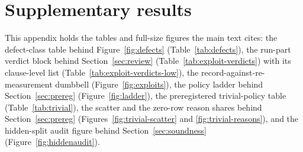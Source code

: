 \section{Supplementary results}
\label{app:results}

This appendix holds the tables and full-size figures the main text cites: the defect-class table behind Figure~\ref{fig:defects} (Table~\ref{tab:defects}), the run-part verdict block behind Section~\ref{sec:review} (Table~\ref{tab:exploit-verdicts}) with its clause-level list (Table~\ref{tab:exploit-verdicts-low}), the record-against-re-measurement dumbbell (Figure~\ref{fig:exploits}), the policy ladder behind Section~\ref{sec:prereg} (Figure~\ref{fig:ladder}), the preregistered trivial-policy table (Table~\ref{tab:trivial}), the scatter and the zero-row reason shares behind Section~\ref{sec:prereg} (Figures~\ref{fig:trivial-scatter} and \ref{fig:trivial-reasons}), and the hidden-split audit figure behind Section~\ref{sec:soundness} (Figure~\ref{fig:hiddenaudit}).










